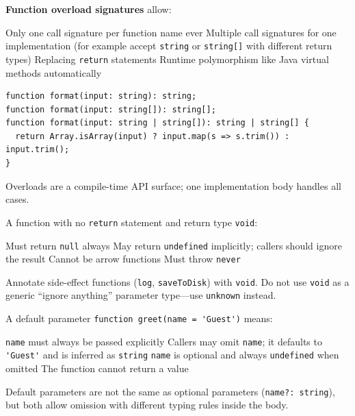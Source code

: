 \question[4]
\textbf{Function overload signatures} allow:
\begin{choices}
  \choice Only one call signature per function name ever
  \CorrectChoice Multiple call signatures for one implementation (for example accept \lstinline[style=tsinline]|string| or \lstinline[style=tsinline]|string[]| with different return types)
  \choice Replacing \lstinline[style=tsinline]|return| statements
  \choice Runtime polymorphism like Java virtual methods automatically
\end{choices}
\begin{solution}
\begin{lstlisting}[style=ts]
function format(input: string): string;
function format(input: string[]): string[];
function format(input: string | string[]): string | string[] {
  return Array.isArray(input) ? input.map(s => s.trim()) : input.trim();
}
\end{lstlisting}
  Overloads are a compile-time API surface; one implementation body handles all cases.
\end{solution}

\question[4]
A function with no \texttt{return} statement and return type \lstinline[style=tsinline]|void|:
\begin{choices}
  \choice Must return \lstinline[style=tsinline]|null| always
  \CorrectChoice May return \lstinline[style=tsinline]|undefined| implicitly; callers should ignore the result
  \choice Cannot be arrow functions
  \choice Must throw \lstinline[style=tsinline]|never|
\end{choices}
\begin{solution}
  Annotate side-effect functions (\lstinline[style=tsinline]|log|, \lstinline[style=tsinline]|saveToDisk|) with \lstinline[style=tsinline]|void|. Do not use \lstinline[style=tsinline]|void| as a generic ``ignore anything'' parameter type---use \lstinline[style=tsinline]|unknown| instead.
\end{solution}

\question[4]
A default parameter \lstinline[style=tsinline]|function greet(name = 'Guest')| means:
\begin{choices}
  \choice \lstinline[style=tsinline]|name| must always be passed explicitly
  \CorrectChoice Callers may omit \lstinline[style=tsinline]|name|; it defaults to \lstinline[style=tsinline]|'Guest'| and is inferred as \lstinline[style=tsinline]|string|
  \choice \lstinline[style=tsinline]|name| is optional and always \lstinline[style=tsinline]|undefined| when omitted
  \choice The function cannot return a value
\end{choices}
\begin{solution}
  Default parameters are not the same as optional parameters (\lstinline[style=tsinline]|name?: string|), but both allow omission with different typing rules inside the body.
\end{solution}

